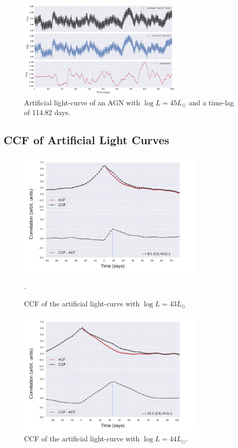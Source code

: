 \documentclass[letterpaper, oneside]{article}
\begin{document}
\begin{figure}[h]
	\centering
	\includegraphics[width=0.7\textwidth]{../lc_plots/art_lcs_logL45.pdf}
	\caption{Artificial light-curve of an AGN with $\log L = 45 L_{\odot}$ and a time-lag of 114.82 days.}
	\label{fig:art_lcs_L45}
\end{figure}

\subsection{CCF of Artificial Light Curves}

\begin{figure}[h]
	\centering
	\includegraphics[width=0.8\textwidth]{../CCF_plots/x_y_bands_43_final.pdf}
	\caption{CCF of the artificial light-curve with $\log L = 43 L_{\odot}$}.
	\label{fig:ccf_art_lcs_L43}
\end{figure}

\begin{figure}[h]
	\centering
	\includegraphics[width=0.8\textwidth]{../CCF_plots/x_y_bands_44_final.pdf}
	\caption{CCF of the artificial light-curve with $\log L = 44 L_{\odot}$.}
	\label{fig:ccf_art_lcs_L44}
\end{figure}
\end{document}
